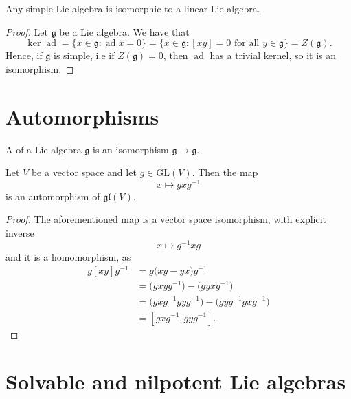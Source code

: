 \documentclass{article}
\newcommand{\lb}[1]{\ensuremath{\left[{#1}\right]}}
\DeclareMathOperator{\ad}{ad}
\newcommand{\frkg}{{\ensuremath{\mathfrak{g}}}}
\newcommand{\GL}{\ensuremath{\text{GL}}}
\newcommand{\glalg}{\ensuremath{\mathfrak{gl}}}
\begin{document}
\begin{corollary}
    Any simple Lie algebra is isomorphic to a linear Lie algebra.
\end{corollary}

\begin{proof}
    Let $\frkg$ be a Lie algebra.
    We have that
    \[
        \ker \ad 
        =
        \Big\{
            x \in \frkg: \ad x = 0
        \Big\}
        =
        \Big\{
            x \in \frkg: \lb{xy} = 0 \text{ for all } y \in \frkg
        \Big\}
        =
        Z(\frkg).
    \]
    Hence, if $\frkg$ is simple, i.e if $Z(\frkg) = 0$, then $\ad$ has a trivial kernel, so it is an isomorphism. 
\end{proof}

\section{Automorphisms}

\begin{definition}
    A  of a Lie algebra $\frkg$ is an isomorphism $\frkg \to \frkg$.
\end{definition}

\begin{proposition}
    Let $V$ be a vector space and let $g \in \GL(V)$.
    Then the map
    \[
        x \mapsto gxg^{-1}
    \]
    is an automorphism of $\glalg(V)$.
\end{proposition}
\begin{proof}
    The aforementioned map is a vector space isomorphism, with explicit inverse
    \[
        x \mapsto g^{-1}xg
    \]
    and it is a homomorphism, as
    \begin{align*}
        g\lb{xy}g^{-1}
        &=
        g\Big(xy - yx\Big)g^{-1}
        \\
        &=
        \Big(gxyg^{-1}\Big)
        -
        \Big(gyxg^{-1}\Big)
        \\
        &=
        \Big(gxg^{-1}gyg^{-1}\Big)
        -
        \Big(gyg^{-1}gxg^{-1}\Big)
        \\
        &=
        \lb{gxg^{-1},gyg^{-1}}.
    \end{align*}
\end{proof}

\section{Solvable and nilpotent Lie algebras}
\end{document}
